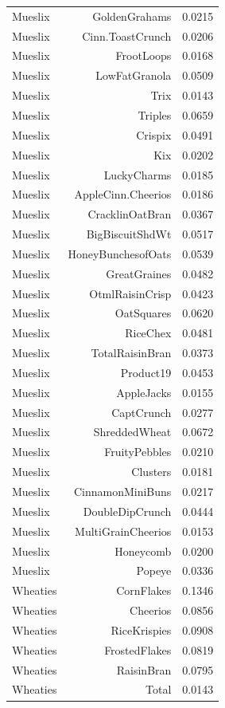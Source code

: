 \begin{longtable}{@{}lrr@{}}
Mueslix & GoldenGrahams & 0.0215 \\
Mueslix & Cinn.ToastCrunch & 0.0206 \\
Mueslix & FrootLoops & 0.0168 \\
Mueslix & LowFatGranola & 0.0509 \\
Mueslix & Trix & 0.0143 \\
Mueslix & Triples & 0.0659 \\
Mueslix & Crispix & 0.0491 \\
Mueslix & Kix & 0.0202 \\
Mueslix & LuckyCharms & 0.0185 \\
Mueslix & AppleCinn.Cheerios & 0.0186 \\
Mueslix & CracklinOatBran & 0.0367 \\
Mueslix & BigBiscuitShdWt & 0.0517 \\
Mueslix & HoneyBunchesofOats & 0.0539 \\
Mueslix & GreatGraines & 0.0482 \\
Mueslix & OtmlRaisinCrisp & 0.0423 \\
Mueslix & OatSquares & 0.0620 \\
Mueslix & RiceChex & 0.0481 \\
Mueslix & TotalRaisinBran & 0.0373 \\
Mueslix & Product19 & 0.0453 \\
Mueslix & AppleJacks & 0.0155 \\
Mueslix & CaptCrunch & 0.0277 \\
Mueslix & ShreddedWheat & 0.0672 \\
Mueslix & FruityPebbles & 0.0210 \\
Mueslix & Clusters & 0.0181 \\
Mueslix & CinnamonMiniBuns & 0.0217 \\
Mueslix & DoubleDipCrunch & 0.0444 \\
Mueslix & MultiGrainCheerios & 0.0153 \\
Mueslix & Honeycomb & 0.0200 \\
Mueslix & Popeye & 0.0336 \\
Wheaties & CornFlakes & 0.1346 \\
Wheaties & Cheerios & 0.0856 \\
Wheaties & RiceKrispies & 0.0908 \\
Wheaties & FrostedFlakes & 0.0819 \\
Wheaties & RaisinBran & 0.0795 \\
Wheaties & Total & 0.0143 \\

\end{longtable}
